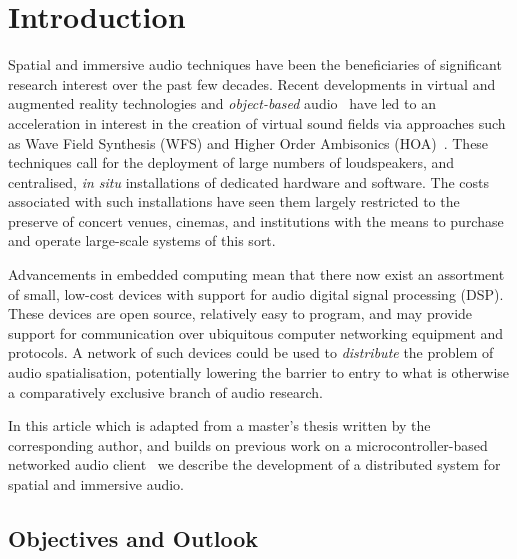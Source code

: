 \section{Introduction}\label{sec:introduction}




Spatial and immersive audio techniques have been the beneficiaries of
significant research interest over the past few decades.
Recent developments in virtual and augmented reality technologies and
\textit{object-based} audio~\citep{geier_object-based_2010} have led to an
acceleration in interest in the creation of virtual sound fields via approaches
such as Wave Field Synthesis (WFS) and Higher Order Ambisonics
(HOA)~\citep{berkhout_acoustic_1993,ahrens_theory_2008,daniel_further_2003,
    frank_producing_2015}.
These techniques call for the deployment of large numbers of loudspeakers, and
centralised, \textit{in situ} installations of dedicated hardware and software.
The costs associated with such installations have seen them largely restricted
to the preserve of concert venues, cinemas, and institutions with the means to
purchase and operate large-scale systems of this sort.

Advancements in embedded computing mean that there now exist an assortment of
small, low-cost devices with support for audio digital signal processing (DSP).
These devices are open source, relatively easy to program, and may provide
support for communication over ubiquitous computer networking equipment and
protocols.
A network of such devices could be used to \textit{distribute} the problem of
audio spatialisation, potentially lowering the barrier to entry to what is
otherwise a comparatively exclusive branch of audio research.

In this article \textemdash{} which is adapted from a master's thesis written by
the corresponding author, and builds on previous work on a microcontroller-based
networked audio client~\citep{rushton_microcontroller-based_2023} \textemdash{}
we describe the development of a distributed system for spatial and immersive
audio.






\subsection{Objectives and Outlook}\label{subsec:objectives}

